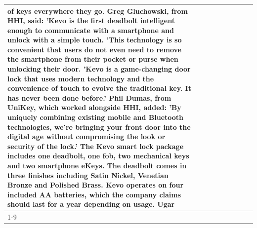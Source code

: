 \begin{table}[H]
\begin{tabular}{lllrlllll}
of keys everywhere they go. Greg Gluchowski, from HHI, said: 'Kevo is the first deadbolt intelligent enough to communicate with a smartphone and unlock with a simple touch. 'This technology is so convenient that users do not even need to remove the smartphone from their pocket or purse when unlocking their door. 'Kevo is a game-changing door lock that uses modern technology and the convenience of touch to evolve the traditional key. It has never been done before.' Phil Dumas, from UniKey, which worked alongside HHI, added: 'By uniquely combining existing mobile and Bluetooth technologies, we’re bringing your front door into the digital age without compromising the look or security of the lock.' The Kevo smart lock package includes one deadbolt, one fob, two mechanical keys and two smartphone eKeys. The deadbolt comes in three finishes including Satin Nickel, Venetian Bronze and Polished Brass. Kevo operates on four included AA batteries, which the company claims should last for a year depending on usage. Ugar \\
\cline{1-9}

\end{tabular}
\end{table}
